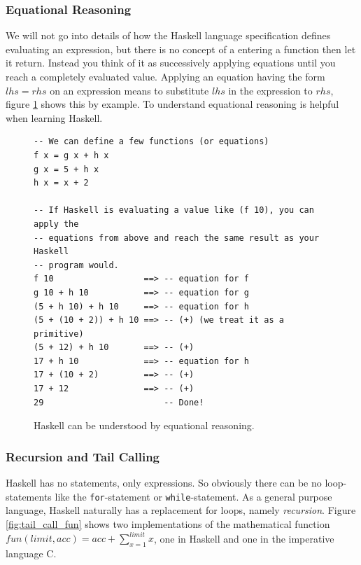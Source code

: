 \subsubsection{Equational Reasoning}

We will not go into details of how the Haskell language specification
defines evaluating an expression, but there is no concept of a
entering a function then let it return. Instead you think of it
as successively applying equations until you reach a completely
evaluated value. Applying an equation having the form $lhs = rhs$ on an
expression means to substitute $lhs$ in the expression to $rhs$, figure
\ref{fig:equational_reasioning} shows this by example.
To understand equational reasoning is helpful when learning Haskell.

\begin{figure}
\begin{mdframed}
  \begin{verbatim}
-- We can define a few functions (or equations)
f x = g x + h x
g x = 5 + h x
h x = x + 2

-- If Haskell is evaluating a value like (f 10), you can apply the
-- equations from above and reach the same result as your Haskell
-- program would.
f 10                  ==> -- equation for f
g 10 + h 10           ==> -- equation for g
(5 + h 10) + h 10     ==> -- equation for h
(5 + (10 + 2)) + h 10 ==> -- (+) (we treat it as a primitive)
(5 + 12) + h 10       ==> -- (+)
17 + h 10             ==> -- equation for h
17 + (10 + 2)         ==> -- (+)
17 + 12               ==> -- (+)
29                        -- Done!
  \end{verbatim}
  \caption{Haskell can be understood by equational reasoning.}
  \label{fig:equational_reasioning}
\end{mdframed}
\end{figure}

\subsubsection{Recursion and Tail Calling}

Haskell has no statements, only expressions. So obviously there
can be no loop-statements like the \texttt{for}-statement or
\texttt{while}-statement. As a general purpose language,
Haskell naturally has a replacement for loops, namely \emph{recursion}. Figure
\ref{fig:tail_call_fun} shows two implementations of the mathematical
function $ fun(limit, acc) = acc + \sum_{x=1}^{limit}{x} $, one in
Haskell and one in the imperative language C.


